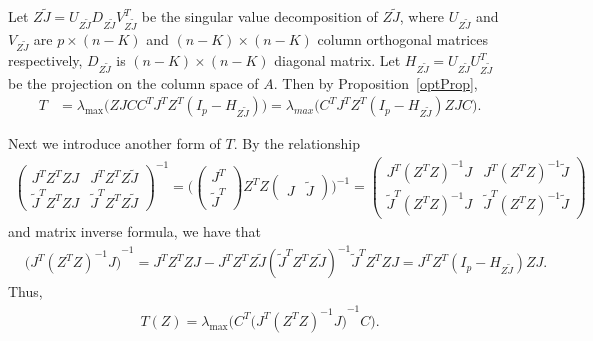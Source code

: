 \documentclass[review]{elsarticle}
\theoremstyle{plain}
\theoremstyle{definition}
\theoremstyle{remark}
\begin{document}
Let $Z\tilde{J}=U_{Z\tilde{J}}D_{Z\tilde{J}}V_{Z\tilde{J}}^T$ be the singular value decomposition of $Z\tilde{J}$, where $U_{Z\tilde{J}}$ and $V_{Z\tilde{J}}$ are $p\times (n-K)$ and $(n-K)\times(n-K)$ column orthogonal matrices respectively, $D_{Z\tilde{J}}$ is $(n-K)\times (n-K)$ diagonal matrix.
Let $H_{Z\tilde{J}}=U_{Z\tilde{J}}U_{Z\tilde{J}}^T$ be the projection on the column space of $A$.
Then by Proposition~\ref{optProp}, 
\begin{equation}\label{statisticForm1}
\begin{aligned}
    T&=\lambda_{\max}\big(ZJCC^TJ^TZ^T (I_p-
    H_{Z\tilde{J}})
    \big)
    =\lambda_{max}\big(C^TJ^TZ^T (I_p-
    H_{Z\tilde{J}}
    )ZJC\big).
\end{aligned}
\end{equation}

Next we introduce another form of $T$.
By the relationship
\begin{equation*}
    \begin{aligned}
        \begin{pmatrix}
            J^T Z^T ZJ & J^T Z^T Z\tilde{J}\\
            \tilde{J}^T Z^T ZJ & \tilde{J}^T Z^T Z \tilde{J}
        \end{pmatrix}^{-1}
        =
        \Big(
        \begin{pmatrix}
            J^T\\
            \tilde{J}^T
        \end{pmatrix}
        Z^T Z
        \begin{pmatrix}
            J&\tilde{J}
        \end{pmatrix}
        \Big)^{-1}
        =
        \begin{pmatrix}
            J^T {(Z^T Z)}^{-1}J & J^T {(Z^T Z)}^{-1}\tilde{J}\\
            \tilde{J}^T {(Z^T Z)}^{-1}J & \tilde{J}^T {(Z^T Z)}^{-1} \tilde{J}
        \end{pmatrix}
    \end{aligned}
\end{equation*}
and matrix inverse formula, we have that
\begin{equation*}
    \begin{aligned}
        &{\big( J^T {(Z^T Z)}^{-1}J \big)}^{-1}
        =J^T Z^T ZJ - J^T Z^T Z\tilde{J}{(\tilde{J}^T Z^T Z \tilde{J})}^{-1}
            \tilde{J}^T Z^T ZJ 
        = J^T Z^T( I_p- H_{Z\tilde{J}}) ZJ.
    \end{aligned}
\end{equation*}
Thus, 
\begin{equation}\label{statisticForm2}
    \begin{aligned}
        T(Z)=
        \lambda_{\max}\Big(C^T{\big( J^T {(Z^T Z)}^{-1}J \big)}^{-1}C\Big).
    \end{aligned}
\end{equation}
\end{document}
